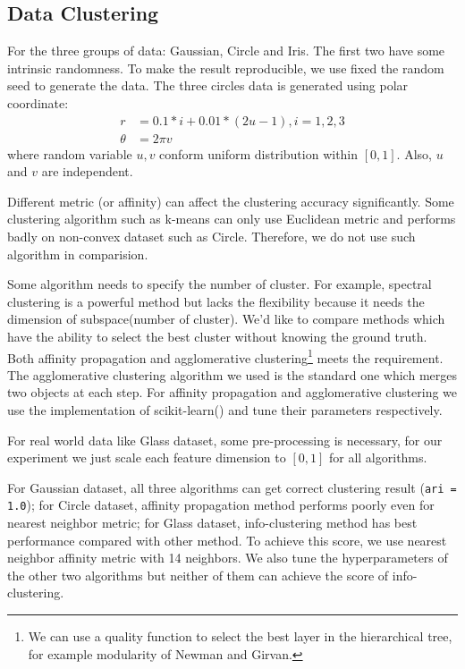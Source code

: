\documentclass{article}
\begin{document}
\subsection{Data Clustering}
For the three groups of data: \textsf{Gaussian}, \textsf{Circle} and \textsf{Iris}. The first two have some intrinsic randomness. To make the result reproducible, we use fixed the random seed to generate the data. The three circles data is generated using polar coordinate:
\begin{align*}
r &= 0.1*i + 0.01*(2u-1), i = 1, 2, 3\\
\theta & = 2\pi v
\end{align*}
where random variable $u,v$ conform uniform distribution within $[0,1]$. Also, $u$ and $v$ are independent.

Different metric (or affinity) can affect the clustering accuracy significantly. Some clustering algorithm such as \textsf{k-means} can only use Euclidean metric and performs badly on non-convex dataset such as \textsf{Circle}. Therefore, we do not use such algorithm in comparision. 

Some algorithm needs to specify the number of cluster.  For example, spectral clustering is a powerful method but lacks the flexibility because it needs the dimension of subspace(number of cluster).  We'd like to compare methods which have the ability to select the best cluster without knowing the ground truth. Both \textsf{affinity propagation} and \textsf{agglomerative clustering}\footnote{We can use a quality function to select the best layer in the hierarchical tree, for example modularity of Newman and Girvan.} meets the requirement. The agglomerative clustering algorithm we used is the standard one which merges two objects at each step. For \textsf{affinity propagation} and \textsf{agglomerative clustering} we use the implementation of \textsf{scikit-learn}(\cite{scikit-learn}) and tune their parameters respectively.

For real world data like Glass dataset, some pre-processing is necessary, for our experiment we just scale each feature dimension to $[0, 1]$ for all algorithms.

For \textsf{Gaussian} dataset, all three algorithms can get correct clustering result (\texttt{ari = 1.0}); for \textsf{Circle} dataset, affinity propagation method performs poorly even for nearest neighbor metric; for \textsf{Glass} dataset, info-clustering method has best performance compared with other method. To achieve this score, we use nearest neighbor affinity metric with 14 neighbors. We also tune the hyperparameters of the other two algorithms but neither of them can achieve the score of info-clustering.
\end{document}
